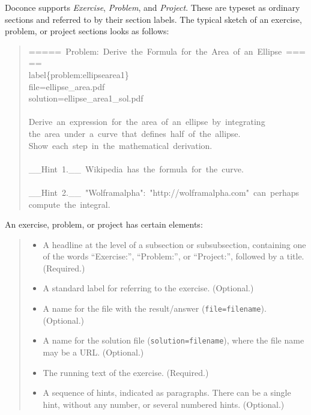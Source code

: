 \documentclass[a4paper]{article}
\begin{document}
Doconce supports \emph{Exercise}, \emph{Problem}, and \emph{Project}. These are typeset
as ordinary sections and referred to by their section labels.
The typical sketch of an exercise, problem, or project sections
looks as follows:
%
\begin{quote}{\ttfamily \raggedright \noindent
=====~Problem:~Derive~the~Formula~for~the~Area~of~an~Ellipse~=====\\
label\{problem:ellipsearea1\}\\
file=ellipse\_area.pdf\\
solution=ellipse\_area1\_sol.pdf\\
~\\
Derive~an~expression~for~the~area~of~an~ellipse~by~integrating\\
the~area~under~a~curve~that~defines~half~of~the~allipse.\\
Show~each~step~in~the~mathematical~derivation.\\
~\\
\_\_Hint~1.\_\_~Wikipedia~has~the~formula~for~the~curve.\\
~\\
\_\_Hint~2.\_\_~"Wolframalpha":~"http://wolframalpha.com"~can~perhaps\\
compute~the~integral.
}
\end{quote}

An exercise, problem, or project has certain elements:
%
\begin{quote}
%
\begin{itemize}

\item A headline at the level of a subsection or subsubsection,
containing one of the words ``Exercise:'', ``Problem:'', or
``Project:'', followed by a title. (Required.)

\item A standard label for referring to the exercise. (Optional.)

\item A name for the file with the result/answer (\texttt{file=filename}). (Optional.)

\item A name for the solution file (\texttt{solution=filename}), where the file
name may be a URL. (Optional.)

\item The running text of the exercise. (Required.)

\item A sequence of hints, indicated as paragraphs. There can be a
single hint, without any number, or several numbered hints.
(Optional.)

\end{itemize}

\end{quote}
\end{document}

